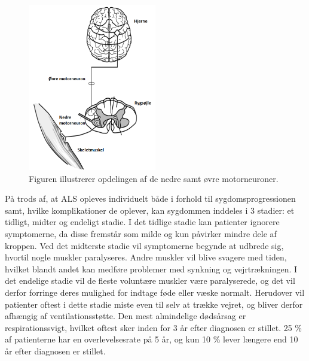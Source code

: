 \begin{figure}[H]
\centering
\includegraphics[width=0.5\textwidth]{figures/motorneuroner.png}
\caption{Figuren illustrerer opdelingen af de nedre samt øvre motorneuroner. \citep{miller2005}}
\label{fig:motorneuroner}
\end{figure}

På trods af, at ALS opleves individuelt både i forhold til sygdomsprogressionen samt, hvilke komplikationer de oplever, kan sygdommen inddeles i 3 stadier: et tidligt, midter og endeligt stadie. 
I det tidlige stadie kan patienter ignorere symptomerne, da disse fremstår som milde og kun påvirker mindre dele af kroppen. 
Ved det midterste stadie vil symptomerne begynde at udbrede sig, hvortil nogle muskler paralyseres. Andre muskler vil blive svagere med tiden, hvilket blandt andet kan medføre problemer med synkning og vejrtrækningen. I det endelige stadie vil de fleste voluntære muskler være paralyserede, og det vil derfor forringe deres mulighed for indtage føde eller væske normalt. Herudover vil patienter oftest i dette stadie miste even til selv at trække vejret, og bliver derfor afhængig af ventilationsstøtte. \citep{themusculardystrophyassociation2016} 
Den mest almindelige dødsårsag er respirationssvigt, hvilket oftest sker inden for 3 år efter diagnosen er stillet. 25 \% af patienterne har en overlevelsesrate på 5 år, og kun 10 \% lever længere end 10 år efter diagnosen er stillet. \citep{grehl2011} \citep{miller2005}




